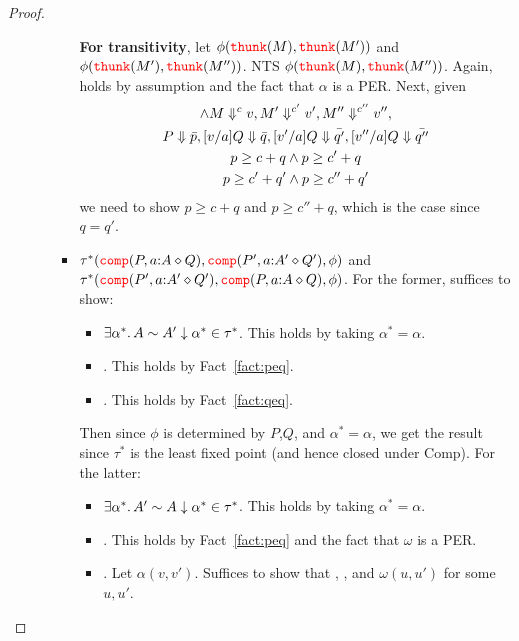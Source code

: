 \begin{proof}
\begin{enumerate}
\begin{itemize}
\begin{itemize}
        \textbf{For transitivity}, let $\phi({\color{red}{\mathtt{thunk}}}(M), {\color{red}{\mathtt{thunk}}}(M'))$ and 
        $\phi({\color{red}{\mathtt{thunk}}}(M'), {\color{red}{\mathtt{thunk}}}(M''))$. NTS $\phi({\color{red}{\mathtt{thunk}}}(M), {\color{red}{\mathtt{thunk}}}(M''))$. Again,
         holds by assumption and the fact that $\alpha$ is 
        a PER. Next, given 
        \begin{gather*}
          \land M \Downarrow^{c} v, M' \Downarrow^{c'} v', M'' \Downarrow^{c''} v'',\\
          P \Downarrow \bar{p},
          [v/a]Q \Downarrow \bar{q},
            [v'/a]Q \Downarrow \bar{q'}, [v''/a]Q \Downarrow \bar{q''}\\
          p \ge c + q \land p \ge c' + q\\
          p \ge c' + q' \land p \ge c'' + q'
        \end{gather*}
        we need to show $p \ge c  + q$ and $p \ge c'' + q$, which is the case 
        since $q = q'$.
      \item \textbf{}$\tau^*({\color{red}{\mathtt{comp}}}(P, a {:} A \diamond Q), {\color{red}{\mathtt{comp}}}(P', a {:} A' \diamond Q'), \phi)$ and
        $\tau^*({\color{red}{\mathtt{comp}}}(P', a {:} A' \diamond Q'), {\color{red}{\mathtt{comp}}}(P, a {:} A \diamond Q), \phi)$.
        For the former, suffices to show:
        \begin{itemize}
           \item $\exists \alpha^*.\, A \sim A' \downarrow \alpha^* \in \tau^*$. This holds by 
             taking $\alpha^* = \alpha$. 
           \item {}. This holds by Fact~\ref{fact:peq}.
           \item {}. This holds by 
             Fact~\ref{fact:qeq}.
        \end{itemize}
        Then since $\phi$ is determined by $P$,$Q$, and $\alpha^* = \alpha$, we get the 
        result since $\tau^*$ is the least fixed point (and hence closed under Comp).
        For the latter:
        \begin{itemize}
           \item $\exists \alpha^*.\, A' \sim A \downarrow \alpha^* \in \tau^*$. This holds by 
             taking $\alpha^* = \alpha$. 
           \item {}. This holds by Fact~\ref{fact:peq} and 
             the fact that $\omega$ is a PER.
           \item {}. 
             Let $\alpha(v,v')$. Suffices to show that 
             , , and $\omega(u,u')$ for some $u,u'$. 

\end{itemize}
\end{itemize}
\end{itemize}
\end{enumerate}
\end{proof}
